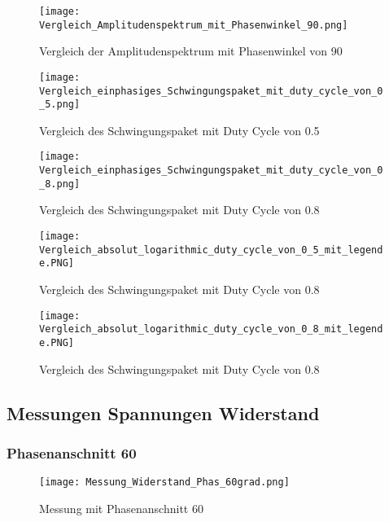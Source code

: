 \begin{appendix}
\begin{figure}[ht!]
	\centering
	\texttt{[image: Vergleich\_Amplitudenspektrum\_mit\_Phasenwinkel\_90.png]}	
	\caption{Vergleich der Amplitudenspektrum mit Phasenwinkel von 90\textdegree}
	\label{fig:Vergleich_der_Amplitudenspektrum_mit Phasenwinkel_von_90}
\end{figure}

\begin{figure}[ht!]
	\centering
	\texttt{[image: Vergleich\_einphasiges\_Schwingungspaket\_mit\_duty\_cycle\_von\_0\_5.png]}	
	\caption{Vergleich des Schwingungspaket mit Duty Cycle von 0.5}
	\label{fig:Vergleich des Schwingungspaket mit Duty Cycle von 0.5}
\end{figure}

\newpage

\begin{figure}[ht!]
	\centering
	\texttt{[image: Vergleich\_einphasiges\_Schwingungspaket\_mit\_duty\_cycle\_von\_0\_8.png]}	
	\caption{Vergleich des Schwingungspaket mit Duty Cycle von 0.8}
	\label{fig:Vergleich des Schwingungspaket mit Duty Cycle von 0.8}
\end{figure}

\begin{figure}[ht!]
	\centering
	\texttt{[image: Vergleich\_absolut\_logarithmic\_duty\_cycle\_von\_0\_5\_mit\_legende.PNG]}	
	\caption{Vergleich des Schwingungspaket mit Duty Cycle von 0.8}
	\label{fig:Vergleich_absolut_logarithmic_duty_cycle_von_0_5_mit_legende}
\end{figure}

\begin{figure}[ht!]
	\centering
	\texttt{[image: Vergleich\_absolut\_logarithmic\_duty\_cycle\_von\_0\_8\_mit\_legende.PNG]}	
	\caption{Vergleich des Schwingungspaket mit Duty Cycle von 0.8}
	\label{fig:Vergleich_absolut_logarithmic_duty_cycle_von_0_8_mit_legende}
\end{figure}

\newpage
\subsection{Messungen Spannungen Widerstand}\label{sec:Mess_Spannung_Widerstand}
\subsubsection*{Phasenanschnitt 60\textdegree}

\begin{figure}[ht!]
	\centering
	\texttt{[image: Messung\_Widerstand\_Phas\_60grad.png]}	
	\caption{Messung mit Phasenanschnitt 60\textdegree}\label{fig:Mess_Phas_60}
\end{figure}
\newpage

\end{appendix}
